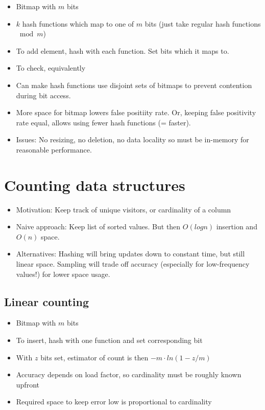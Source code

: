 \documentclass[a4paper]{scrreprt}
\begin{document}
\begin{itemize}
		\item Bitmap with $m$ bits
		\item $k$ hash functions which map to one of $m$ bits (just take
				regular hash functions $\bmod m$)
		\item To add element, hash with each function. Set bits which it maps to.
		\item To check, equivalently
		\item Can make hash functions use disjoint sets of bitmaps to prevent
				contention during bit access.
		\item More space for bitmap lowers false positiity rate. Or, keeping
				false positivity rate equal, allows using fewer hash functions
				(= faster).
		\item Issues: No resizing, no deletion, no data locality so must be
				in-memory for reasonable performance.
\end{itemize}

\section{Counting data structures}

\begin{itemize}
		\item Motivation: Keep track of unique visitors, or cardinality of a column
		\item Naive approach: Keep list of sorted values. But then $O(log n)$
				insertion and $O(n)$ space.
		\item Alternatives: Hashing will bring updates down to constant time,
				but still linear space. Sampling will trade off accuracy
				(especially for low-frequency values!) for lower space usage.
\end{itemize}

\subsection{Linear counting}

\begin{itemize}
		\item Bitmap with $m$ bits
		\item To insert, hash with one function and set corresponding bit
		\item With $z$ bits set, estimator of count is then $-m \cdot ln(1 - z/m)$
		\item Accuracy depends on load factor, so cardinality must be roughly known upfront
		\item Required space to keep error low is proportional to cardinality
\end{itemize}
\end{document}
